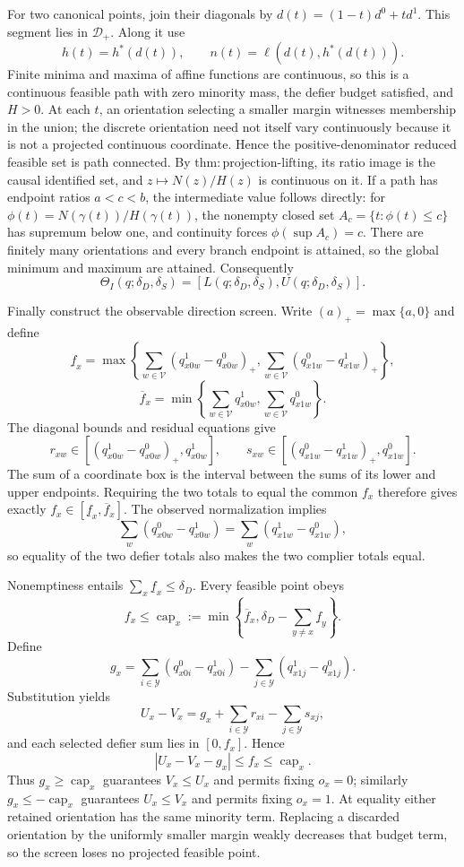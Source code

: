 For two canonical points, join their diagonals by \(d(t)=(1-t)d^0+td^1\). This segment lies in \(\mathcal D_+\). Along it use
\[
 h(t)=h^*(d(t)),
 \qquad n(t)=\ell(d(t),h^*(d(t))).
\]
Finite minima and maxima of affine functions are continuous, so this is a continuous feasible path with zero minority mass, the defier budget satisfied, and \(H>0\). At each \(t\), an orientation selecting a smaller margin witnesses membership in the union; the discrete orientation need not itself vary continuously because it is not a projected continuous coordinate. Hence the positive-denominator reduced feasible set is path connected. By \(\mathrm{thm:projection\text{-}lifting}\), its ratio image is the causal identified set, and \(z\mapsto N(z)/H(z)\) is continuous on it. If a path has endpoint ratios \(a<c<b\), the intermediate value follows directly: for \(\phi(t)=N(\gamma(t))/H(\gamma(t))\), the nonempty closed set \(A_c=\{t:\phi(t)\leq c\}\) has supremum below one, and continuity forces \(\phi(\sup A_c)=c\). There are finitely many orientations and every branch endpoint is attained, so the global minimum and maximum are attained. Consequently
\[
 \Theta_I(q;\delta_D,\delta_S)
 =[L(q;\delta_D,\delta_S),U(q;\delta_D,\delta_S)].
\]

Finally construct the observable direction screen. Write \((a)_+=\max\{a,0\}\) and define
\[
 \underline f_x=
 \max\left\{
 \sum_{w\in\mathcal V}(q^1_{x0w}-q^0_{x0w})_+,
 \sum_{w\in\mathcal V}(q^0_{x1w}-q^1_{x1w})_+
 \right\},
\]
\[
 \overline f_x=
 \min\left\{
 \sum_{w\in\mathcal V}q^1_{x0w},
 \sum_{w\in\mathcal V}q^0_{x1w}
 \right\}.
\]
The diagonal bounds and residual equations give
\[
 r_{xw}\in[(q^1_{x0w}-q^0_{x0w})_+,q^1_{x0w}],
 \qquad
 s_{xw}\in[(q^0_{x1w}-q^1_{x1w})_+,q^0_{x1w}].
\]
The sum of a coordinate box is the interval between the sums of its lower and upper endpoints. Requiring the two totals to equal the common \(f_x\) therefore gives exactly \(f_x\in[\underline f_x,\overline f_x]\). The observed normalization implies
\[
 \sum_w(q^0_{x0w}-q^1_{x0w})
 =\sum_w(q^1_{x1w}-q^0_{x1w}),
\]
so equality of the two defier totals also makes the two complier totals equal.

Nonemptiness entails \(\sum_x\underline f_x\leq\delta_D\). Every feasible point obeys
\[
 f_x\leq \operatorname{cap}_x
 :=\min\left\{\overline f_x,
 \delta_D-\sum_{y\ne x}\underline f_y\right\}.
\]
Define
\[
 g_x=
 \sum_{i\in\mathcal Y}(q^0_{x0i}-q^1_{x0i})
 -\sum_{j\in\mathcal Y}(q^1_{x1j}-q^0_{x1j}).
\]
Substitution yields
\[
 U_x-V_x
 =g_x+\sum_{i\in\mathcal Y}r_{xi}
       -\sum_{j\in\mathcal Y}s_{xj},
\]
and each selected defier sum lies in \([0,f_x]\). Hence
\[
 |U_x-V_x-g_x|\leq f_x\leq\operatorname{cap}_x.
\]
Thus \(g_x\geq\operatorname{cap}_x\) guarantees \(V_x\leq U_x\) and permits fixing \(o_x=0\); similarly \(g_x\leq-\operatorname{cap}_x\) guarantees \(U_x\leq V_x\) and permits fixing \(o_x=1\). At equality either retained orientation has the same minority term. Replacing a discarded orientation by the uniformly smaller margin weakly decreases that budget term, so the screen loses no projected feasible point.

